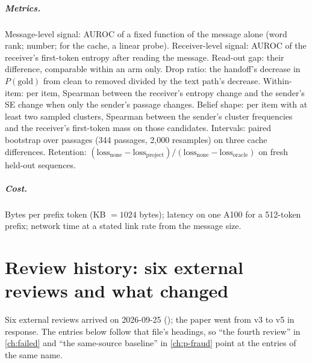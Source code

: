 \documentclass[11pt,a4paper]{report}
\begin{document}
\paragraph{Metrics.} Message-level signal: AUROC of a fixed function of the message alone (word rank; number; for the cache, a linear probe). Receiver-level signal: AUROC of the receiver's first-token entropy after reading the message. Read-out gap: their difference, comparable within an arm only. Drop ratio: the handoff's decrease in $P(\text{gold})$ from clean to removed divided by the text path's decrease. Within-item: per item, Spearman between the receiver's entropy change and the sender's SE change when only the sender's passage changes. Belief shape: per item with at least two sampled clusters, Spearman between the sender's cluster frequencies and the receiver's first-token mass on those candidates. Intervals: paired bootstrap over passages (344 passages, 2,000 resamples) on three cache differences. Retention: $(\mathrm{loss}_{\text{none}} - \mathrm{loss}_{\text{project}}) / (\mathrm{loss}_{\text{none}} - \mathrm{loss}_{\text{oracle}})$ on fresh held-out sequences.

\paragraph{Cost.} Bytes per prefix token (KB $= 1024$ bytes); latency on one A100 for a 512-token prefix; network time at a stated link rate from the message size.

\chapter{Review history: six external reviews and what changed}
\label{app:reviews}

Six external reviews arrived on 2026-09-25 (); the paper went from v3 to v5 in response. The entries below follow that file's headings, so ``the fourth review'' in \cref{ch:failed} and ``the same-source baseline'' in \cref{ch:p-fraud} point at the entries of the same name.
\end{document}
